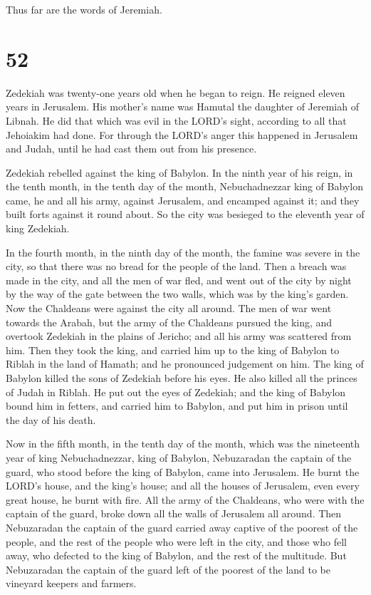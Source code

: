 Thus far are the words of Jeremiah.

\hypertarget{section-51}{%
\section{52}\label{section-51}}

 Zedekiah was twenty-one years old when he began to reign.
He reigned eleven years in Jerusalem. His mother's name was Hamutal the
daughter of Jeremiah of Libnah.  He did that which was evil
in the LORD's sight, according to all that Jehoiakim had done.
 For through the LORD's anger this happened in Jerusalem and
Judah, until he had cast them out from his presence.

Zedekiah rebelled against the king of Babylon.  In the ninth
year of his reign, in the tenth month, in the tenth day of the month,
Nebuchadnezzar king of Babylon came, he and all his army, against
Jerusalem, and encamped against it; and they built forts against it
round about.  So the city was besieged to the eleventh year
of king Zedekiah.

 In the fourth month, in the ninth day of the month, the
famine was severe in the city, so that there was no bread for the people
of the land.  Then a breach was made in the city, and all
the men of war fled, and went out of the city by night by the way of the
gate between the two walls, which was by the king's garden. Now the
Chaldeans were against the city all around. The men of war went towards
the Arabah,  but the army of the Chaldeans pursued the king,
and overtook Zedekiah in the plains of Jericho; and all his army was
scattered from him.  Then they took the king, and carried
him up to the king of Babylon to Riblah in the land of Hamath; and he
pronounced judgement on him.  The king of Babylon killed
the sons of Zedekiah before his eyes. He also killed all the princes of
Judah in Riblah.  He put out the eyes of Zedekiah; and the
king of Babylon bound him in fetters, and carried him to Babylon, and
put him in prison until the day of his death.

 Now in the fifth month, in the tenth day of the month,
which was the nineteenth year of king Nebuchadnezzar, king of Babylon,
Nebuzaradan the captain of the guard, who stood before the king of
Babylon, came into Jerusalem.  He burnt the LORD's house,
and the king's house; and all the houses of Jerusalem, even every great
house, he burnt with fire.  All the army of the Chaldeans,
who were with the captain of the guard, broke down all the walls of
Jerusalem all around.  Then Nebuzaradan the captain of the
guard carried away captive of the poorest of the people, and the rest of
the people who were left in the city, and those who fell away, who
defected to the king of Babylon, and the rest of the multitude.
 But Nebuzaradan the captain of the guard left of the
poorest of the land to be vineyard keepers and farmers.

